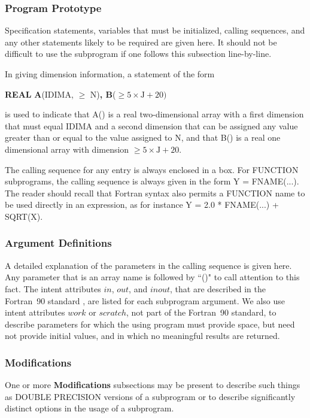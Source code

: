 \documentclass[twoside]{MATH77}
\begin{document}
\subsubsection{Program Prototype}

Specification statements, variables that must be initialized, calling
sequences, and any other statements likely to be required are given here. It
should not be difficult to use the subprogram if one follows this subsection
line-by-line.

In giving dimension information, a statement of the form

{\bf REAL} {\bf A}(IDIMA, $\geq $ N){\bf , B}($\geq 5 \times \text{J} + 20)$

is used to indicate that A() is a real two-dimensional array with a first
dimension that must equal IDIMA and a second dimension that can be assigned
any value greater than or equal to the value assigned to N, and that B()
is a real one dimensional array with dimension $\geq 5 \times \text{J} + 20.$

The calling sequence for any entry is always enclosed in a box. For FUNCTION
subprograms, the calling sequence is always given in the form Y = FNAME(...).
The reader should recall that Fortran syntax also permits a FUNCTION name
to be used directly in an expression, as for instance Y = 2.0 * FNAME(...)
+ SQRT(X).

\subsubsection{Argument Definitions}

A detailed explanation of the parameters in the calling sequence is given
here.  Any parameter that is an array name is followed by ``()" to call
attention to this fact.  The intent attributes $in$, $out$, and $inout$,
that are described in the Fortran~90 standard \cite{Fortran90}, are
listed for each subprogram argument.  We also use intent attributes $work$
or $scratch$, not part of the Fortran~90 standard, to describe parameters
for which the using program must provide space, but need not provide
initial values, and in which no meaningful results are returned.

\subsubsection{Modifications}

One or more {\bf Modifications} subsections may be present to describe such
things as DOUBLE PRECISION versions of a subprogram or to describe
significantly distinct options in the usage of a subprogram.
\end{document}
